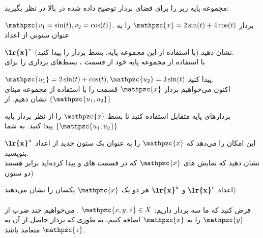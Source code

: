 \documentclass[a4paper,12pt]{report}
\begin{document}
      \textbf{}
      مجموعه پایه زیر را برای فضای بردار توضیح داده شده در بالا در نظر بگیرید:
      
      
      $ \mathpzc{v_1=\sin (t), v_2=\cos (t)} $.
      بردار 
      $ \mathpzc{x}=2\sin (t) +4\cos (t) $
       را به عنوان ستونی از اعداد 
       
       \hspace{0.2cm}
       $ \textbf{\lr{x}}^v $
        نشان دهید (با استفاده از این مجموعه پایه، بسط بردار را پیدا کنید).\\
        
        \textbf{}
        با استفاده از مجموعه پایه خود از قسمت ، بسط‌های برداری را برای 
                        
        $ \mathpzc{u_1}=2\sin (t)+\cos (t), 
        \mathpzc{u_2}=3\sin (t) $
         پیدا کنید.\\
         
         \textbf{}
         اکنون می‌خواهیم بردار $ \mathpzc{x} $ قسمت  را با استفاده از مجموعه مبنای 
         $ \{\mathpzc{u_1,u_2}\} $
          نشان دهیم. از 
          
          \hspace{0.6cm}
          بردارهای پایه متقابل استفاده کنید تا بسط $ \mathpzc{x} $ را از نظر بردار پایه 
          $ \{\mathpzc{u_1,u_2}\} $
           پیدا کنید. به شما 
           
           \hspace{0.6cm}
           این امکان را می‌دهد که $ \mathpzc{x} $ را به عنوان یک ستون جدید از اعداد 
           $ \textbf{\lr{x}}^u $
            بنویسید.\\
           
           \textbf{}
           نشان دهید که نمایش های $ \mathpzc{x} $ که در قسمت های  و  پیدا کرده‌اید برابر هستند (دو ستون 
           
           \hspace{0.5cm}
           اعداد 
           $ \textbf{\lr{x}}^v $
            و
           $ \textbf{\lr{x}}^u $
              هر دو یک $ \mathpzc{x} $ یکسان را نشان می‌دهند).\\\\
              
              
        \hspace{-2.5cm}\textbf{}\hspace{0.6cm}  
فرض کنید که ما سه بردار داریم:
$ \mathpzc{x,y,z} \in X $
. می‌خواهیم چند ضرب از $ \mathpzc{y} $ را به $ \mathpzc{x} $ اضافه کنیم، به طوری که بردار حاصل از آن به $ \mathpzc{z} $ متعامد باشد.\\
\end{document}
